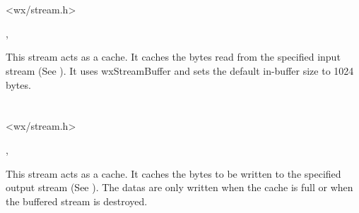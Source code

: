 \section{}\label{wxbufferedinputstream}




<wx/stream.h>


, 


This stream acts as a cache. It caches the bytes read from the specified
input stream (See ).
It uses wxStreamBuffer and sets the default in-buffer size to 1024 bytes.

\section{}\label{wxbufferedoutputstream}




<wx/stream.h>


, 


This stream acts as a cache. It caches the bytes to be written to the specified
output stream (See ). The
datas are only written when the cache is full or when the buffered stream is
destroyed.

